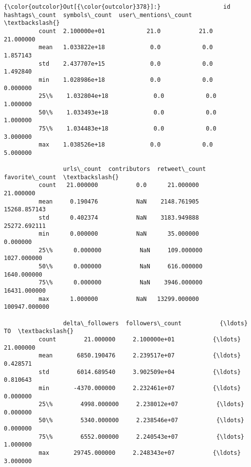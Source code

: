 \documentclass[11pt]{article}
\begin{document}
\begin{Verbatim}[commandchars=\\\{\}]
{\color{outcolor}Out[{\color{outcolor}378}]:}                  id  hashtags\_count  symbols\_count  user\_mentions\_count  \textbackslash{}
          count  2.100000e+01            21.0           21.0            21.000000   
          mean   1.033822e+18             0.0            0.0             1.857143   
          std    2.437707e+15             0.0            0.0             1.492840   
          min    1.028986e+18             0.0            0.0             0.000000   
          25\%    1.032804e+18             0.0            0.0             1.000000   
          50\%    1.033493e+18             0.0            0.0             1.000000   
          75\%    1.034483e+18             0.0            0.0             3.000000   
          max    1.038526e+18             0.0            0.0             5.000000   
          
                 urls\_count  contributors  retweet\_count  favorite\_count  \textbackslash{}
          count   21.000000           0.0      21.000000       21.000000   
          mean     0.190476           NaN    2148.761905    15268.857143   
          std      0.402374           NaN    3183.949888    25272.692111   
          min      0.000000           NaN      35.000000        0.000000   
          25\%      0.000000           NaN     109.000000     1027.000000   
          50\%      0.000000           NaN     616.000000     1640.000000   
          75\%      0.000000           NaN    3946.000000    16431.000000   
          max      1.000000           NaN   13299.000000   100947.000000   
          
                 delta\_followers  followers\_count           {\ldots}                   TO  \textbackslash{}
          count        21.000000     2.100000e+01           {\ldots}            21.000000   
          mean       6850.190476     2.239517e+07           {\ldots}             0.428571   
          std        6014.689540     3.902509e+04           {\ldots}             0.810643   
          min       -4370.000000     2.232461e+07           {\ldots}             0.000000   
          25\%        4998.000000     2.238012e+07           {\ldots}             0.000000   
          50\%        5340.000000     2.238546e+07           {\ldots}             0.000000   
          75\%        6552.000000     2.240543e+07           {\ldots}             1.000000   
          max       29745.000000     2.248343e+07           {\ldots}             3.000000   
          

\end{Verbatim}
\end{document}

